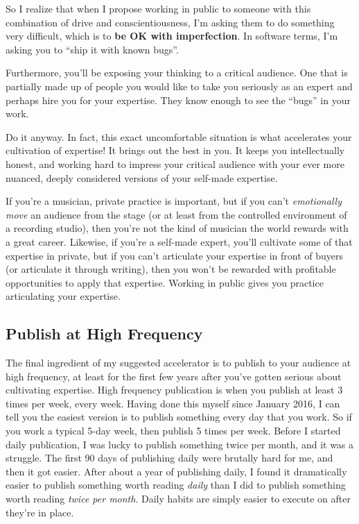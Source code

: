 So I realize that when I propose working in public to someone with this combination of drive and conscientiousness, I'm asking them to do something very difficult, which is to \textbf{be OK with imperfection}. In software terms, I'm asking you to ``ship it with known bugs''.

Furthermore, you'll be exposing your thinking to a critical audience. One that is partially made up of people you would like to take you seriously as an expert and perhaps hire you for your expertise. They know enough to see the ``bugs'' in your work.

Do it anyway. In fact, this exact uncomfortable situation is what accelerates your cultivation of expertise! It brings out the best in you. It keeps you intellectually honest, and working hard to impress your critical audience with your ever more nuanced, deeply considered versions of your self-made expertise.

If you're a musician, private practice is important, but if you can't \emph{emotionally move} an audience from the stage (or at least from the controlled environment of a recording studio), then you're not the kind of musician the world rewards with a great career. Likewise, if you're a self-made expert, you'll cultivate some of that expertise in private, but if you can't articulate your expertise in front of buyers (or articulate it through writing), then you won't be rewarded with profitable opportunities to apply that expertise. Working in public gives you practice articulating your expertise.

\subsection{Publish at High Frequency}

The final ingredient of my suggested accelerator is to publish to your audience at high frequency, at least for the first few years after you've gotten serious about cultivating expertise. High frequency publication is when you publish at least 3 times per week, every week. Having done this myself since January 2016, I can tell you the easiest version is to publish something every day that you work. So if you work a typical 5-day week, then publish 5 times per week. Before I started daily publication, I was lucky to publish something twice per month, and it was a struggle. The first 90 days of publishing daily were brutally hard for me, and then it got easier. After about a year of publishing daily, I found it dramatically easier to publish something worth reading \emph{daily} than I did to publish something worth reading \emph{twice per month}. Daily habits are simply easier to execute on after they're in place.

